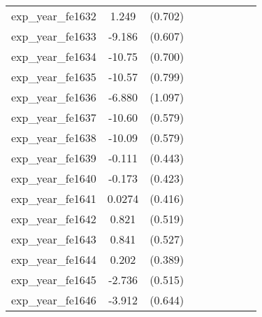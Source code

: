 {\begin{tabular}{l*{4}{cc}}
exp\_year\_fe1632&    1.249         &  (0.702)&                  &         &                  &         &                  &         \\
exp\_year\_fe1633&   -9.186\sym{***}&  (0.607)&                  &         &                  &         &                  &         \\
exp\_year\_fe1634&   -10.75\sym{***}&  (0.700)&                  &         &                  &         &                  &         \\
exp\_year\_fe1635&   -10.57\sym{***}&  (0.799)&                  &         &                  &         &                  &         \\
exp\_year\_fe1636&   -6.880\sym{***}&  (1.097)&                  &         &                  &         &                  &         \\
exp\_year\_fe1637&   -10.60\sym{***}&  (0.579)&                  &         &                  &         &                  &         \\
exp\_year\_fe1638&   -10.09\sym{***}&  (0.579)&                  &         &                  &         &                  &         \\
exp\_year\_fe1639&   -0.111         &  (0.443)&                  &         &                  &         &                  &         \\
exp\_year\_fe1640&   -0.173         &  (0.423)&                  &         &                  &         &                  &         \\
exp\_year\_fe1641&   0.0274         &  (0.416)&                  &         &                  &         &                  &         \\
exp\_year\_fe1642&    0.821         &  (0.519)&                  &         &                  &         &                  &         \\
exp\_year\_fe1643&    0.841         &  (0.527)&                  &         &                  &         &                  &         \\
exp\_year\_fe1644&    0.202         &  (0.389)&                  &         &                  &         &                  &         \\
exp\_year\_fe1645&   -2.736\sym{***}&  (0.515)&                  &         &                  &         &                  &         \\
exp\_year\_fe1646&   -3.912\sym{***}&  (0.644)&                  &         &                  &         &                  &         \\

\end{tabular}}
